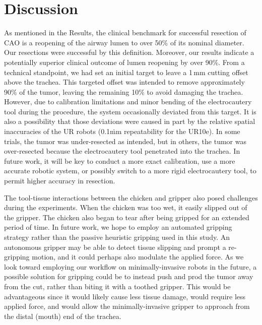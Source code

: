 \section{Discussion}

As mentioned in the Results, the clinical benchmark for successful resection of CAO is a reopening of the airway lumen to over 50\% of its nominal diameter. Our resections were successful by this definition. Moreover, our results indicate a potentially superior clinical outcome of lumen reopening by over 90\%. From a technical standpoint, we had set an initial target to leave a 1\,mm cutting offset above the trachea. This targeted offset was intended to remove approximately 90\% of the tumor, leaving the remaining 10\% to avoid damaging the trachea. However, due to calibration limitations and minor bending of the electrocautery tool during the procedure, the system occasionally deviated from this target. It is also a possibility that those deviations were caused in part by the relative spatial inaccuracies of the UR robots (0.1\.mm repeatability for the UR10e). In some trials, the tumor was under-resected as intended, but in others, the tumor was over-resected because the electrocautery tool penetrated into the trachea. In future work, it will be key to conduct a more exact calibration, use a more accurate robotic system, or possibly switch to a more rigid electrocautery tool, to permit higher accuracy in resection.

The tool-tissue interactions between the chicken and gripper also posed challenges during the experiments. When the chicken was too wet, it easily slipped out of the gripper. The chicken also began to tear after being gripped for an extended period of time. In future work, we hope to employ an automated gripping strategy rather than the passive heuristic gripping used in this study. An autonomous gripper may be able to detect tissue slipping and prompt a re-gripping motion, and it could perhaps also modulate the applied force. As we look toward employing our workflow on minimally-invasive robots in the future, a possible solution for gripping could be to instead push and prod the tumor away from the cut, rather than biting it with a toothed gripper. This would be advantageous since it would likely cause less tissue damage, would require less applied force, and would allow the minimally-invasive gripper to approach from the distal (mouth) end of the trachea.

